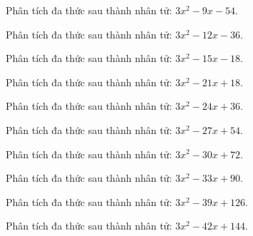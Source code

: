 \begin{bt}
	Phân tích đa thức sau thành nhân tử: $3 x^2 - 9 x - 54$.
\end{bt}
\begin{bt}
	Phân tích đa thức sau thành nhân tử: $3 x^2 - 12 x - 36$.
\end{bt}
\begin{bt}
	Phân tích đa thức sau thành nhân tử: $3 x^2 - 15 x - 18$.
\end{bt}
\begin{bt}
	Phân tích đa thức sau thành nhân tử: $3 x^2 - 21 x + 18$.
\end{bt}
\begin{bt}
	Phân tích đa thức sau thành nhân tử: $3 x^2 - 24 x + 36$.
\end{bt}
\begin{bt}
	Phân tích đa thức sau thành nhân tử: $3 x^2 - 27 x + 54$.
\end{bt}
\begin{bt}
	Phân tích đa thức sau thành nhân tử: $3 x^2 - 30 x + 72$.
\end{bt}
\begin{bt}
	Phân tích đa thức sau thành nhân tử: $3 x^2 - 33 x + 90$.
\end{bt}
\begin{bt}
	Phân tích đa thức sau thành nhân tử: $3 x^2 - 39 x + 126$.
\end{bt}
\begin{bt}
	Phân tích đa thức sau thành nhân tử: $3 x^2 - 42 x + 144$.
\end{bt}
